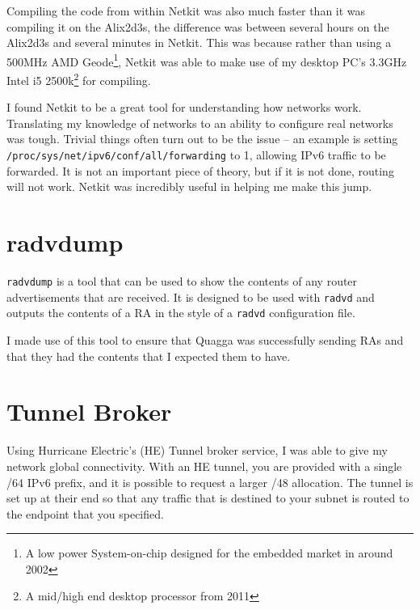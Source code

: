 \documentclass[12pt]{report}
\begin{document}
Compiling the code from within Netkit was also much faster than it was
compiling it on the Alix2d3s, the difference was between several hours on the
Alix2d3s and several minutes in Netkit. This was because rather than using a
500MHz AMD Geode\footnote{A low power System-on-chip designed for the embedded market
in around 2002}, Netkit was able to make use of my desktop PC's 3.3GHz 
Intel i5 2500k\footnote{A mid/high end desktop processor from 2011} for
compiling. 

I found Netkit to be a great tool for understanding how networks work.
Translating my knowledge of networks to an ability to configure real networks
was tough. Trivial things often turn out to be the issue -- an example is
setting \texttt{/proc/sys/net/ipv6/conf/all/forwarding} to 1, allowing IPv6
traffic to be forwarded. It is not an important piece of theory, but if it is
not done, routing will not work. Netkit was incredibly useful in helping me
make this jump. 


\section{radvdump}
\texttt{radvdump} is a tool that can be used to show the contents of any
router advertisements that are received. It is designed to be used with
\texttt{radvd} and outputs the contents of a RA in the style of a
\texttt{radvd} configuration file. 

I made use of this tool to ensure that Quagga was successfully sending RAs and
that they had the contents that I expected them to have. 


\section{Tunnel Broker}
Using Hurricane Electric's (HE) Tunnel broker service, I was able to give my
network global connectivity. With an HE tunnel, you are 
provided with a single /64 IPv6 prefix, and it is possible to request a larger
/48 allocation. The tunnel is set up at their end so that any traffic
that is destined to your subnet is routed to the endpoint that you specified.  
\end{document}
